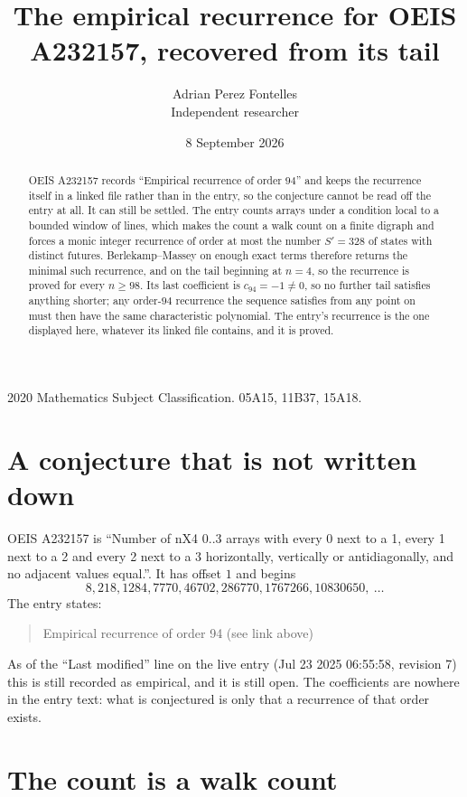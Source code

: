 \documentclass[11pt,a4paper]{article}
\title{The empirical recurrence for OEIS A232157, recovered from its tail}
\author{Adrian Perez Fontelles\\ \small Independent researcher}
\date{8 September 2026}
\theoremstyle{plain}
\theoremstyle{definition}
\begin{document}
\maketitle

\begin{abstract}
OEIS A232157 records ``Empirical recurrence of order $94$'' and keeps the recurrence itself in
a linked file rather than in the entry, so the conjecture cannot be read off the entry at all.
It can still be settled. The entry counts arrays under a condition local to a bounded window of
lines, which makes the count a walk count on a finite digraph and forces a monic integer
recurrence of order at most the number $S'=328$ of states with distinct futures. Berlekamp--Massey on
enough exact terms therefore returns the minimal such recurrence, and on the tail beginning at $n=4$, so the recurrence is proved for every $n\ge98$.
Its last coefficient is $c_{94}=-1\neq0$, so no further tail satisfies anything
shorter; any order-$94$ recurrence the sequence satisfies from any point on must then have
the same characteristic polynomial. The entry's recurrence is the one displayed here, whatever
its linked file contains, and it is proved.
\end{abstract}

\noindent\small 2020 Mathematics Subject Classification. 05A15, 11B37, 15A18.\normalsize

\section{A conjecture that is not written down}

OEIS A232157 is ``Number of nX4 0..3 arrays with every 0 next to a 1, every 1 next to a 2 and every 2 next to a 3 horizontally, vertically or antidiagonally, and no adjacent values equal.''. It has offset $1$ and begins
\[
8, 218, 1284, 7770, 46702, 286770, 1767266, 10830650,\ \dots
\]
The entry states:
\begin{quote}
Empirical recurrence of order 94 (see link above)
\end{quote}
As of the ``Last modified'' line on the live entry (Jul 23 2025 06:55:58, revision 7)
this is still recorded as empirical, and it is still open. The coefficients are nowhere in the
entry text: what is conjectured is only that a recurrence of that order exists.

\section{The count is a walk count}
\end{document}
